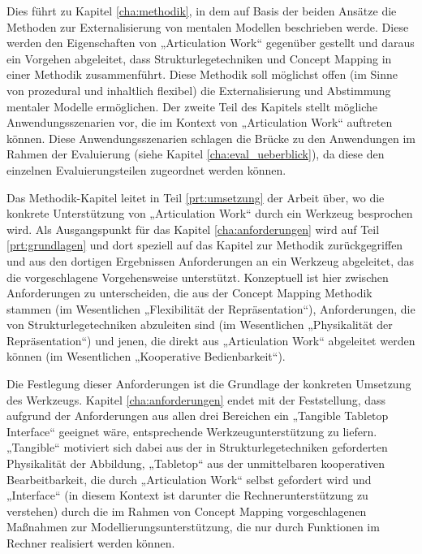 Dies führt zu Kapitel \ref{cha:methodik}, in dem auf Basis der beiden Ansätze die Methoden zur Externalisierung von mentalen Modellen beschrieben werde. Diese werden den Eigenschaften von „Articulation Work“ gegenüber gestellt und daraus ein Vorgehen abgeleitet, dass Strukturlegetechniken und Concept Mapping in einer Methodik zusammenführt. Diese Methodik soll möglichst offen (im Sinne von prozedural und inhaltlich flexibel) die Externalisierung und Abstimmung mentaler Modelle ermöglichen. Der zweite Teil des Kapitels stellt mögliche Anwendungsszenarien vor, die im Kontext von „Articulation Work“ auftreten können. Diese Anwendungsszenarien schlagen die Brücke zu den Anwendungen im Rahmen der Evaluierung (siehe Kapitel \ref{cha:eval_ueberblick}), da diese den einzelnen Evaluierungsteilen zugeordnet werden können.

Das Methodik-Kapitel leitet in Teil \ref{prt:umsetzung} der Arbeit über, wo die konkrete Unterstützung von „Articulation Work“ durch ein Werkzeug besprochen wird. Als Ausgangspunkt für das Kapitel \ref{cha:anforderungen} wird auf Teil \ref{prt:grundlagen} und dort speziell auf das Kapitel zur Methodik zurückgegriffen und aus den dortigen Ergebnissen Anforderungen an ein Werkzeug abgeleitet, das die vorgeschlagene Vorgehensweise unterstützt. Konzeptuell ist hier zwischen Anforderungen zu unterscheiden, die aus der Concept Mapping Methodik stammen (im Wesentlichen „Flexibilität der Repräsentation“), Anforderungen, die von Strukturlegetechniken abzuleiten sind (im Wesentlichen „Physikalität der Repräsentation“) und jenen, die direkt aus „Articulation Work“ abgeleitet werden können (im Wesentlichen „Kooperative Bedienbarkeit“).

Die Festlegung dieser Anforderungen ist die Grundlage der konkreten Umsetzung des Werkzeugs. Kapitel \ref{cha:anforderungen} endet mit der Feststellung, dass aufgrund der Anforderungen aus allen drei Bereichen ein „Tangible Tabletop Interface“ geeignet wäre, entsprechende Werkzeugunterstützung zu liefern. „Tangible“ motiviert sich dabei aus der in Strukturlegetechniken geforderten Physikalität der Abbildung, „Tabletop“ aus der unmittelbaren kooperativen Bearbeitbarkeit, die durch „Articulation Work“ selbst gefordert wird und „Interface“ (in diesem Kontext ist darunter die Rechnerunterstützung zu verstehen) durch die im Rahmen von Concept Mapping vorgeschlagenen Maßnahmen zur Modellierungsunterstützung, die nur durch Funktionen im Rechner realisiert werden können.

